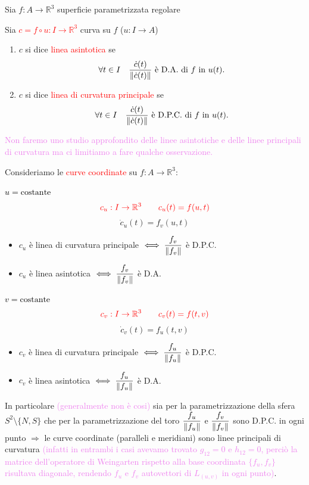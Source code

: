         \newpage
        \begin{definizione}
        Sia $f : A \to \mathbb{R}^3$ superficie parametrizzata regolare
        
        Sia \textcolor{red}{$c = f \circ u : I \to \mathbb{R}^3$} curva su $f$ \textcolor{blu}{($u : I \to A$)}
        \begin{enumerate}[label=\textcolor{red}{\arabic*.}]
            \item $c$ si dice \textcolor{red}{linea asintotica} se
            \[
            \forall t \in I \quad \dfrac{\dot{c}(t)}{\lVert\dot{c}(t)\rVert} \text{ è D.A. di } f \text{ in } u(t).
            \]
            \item $c$ si dice \textcolor{red}{linea di curvatura principale} se
            \[
            \forall t \in I \quad \dfrac{\dot{c}(t)}{\lVert\dot{c}(t)\rVert} \text{ è D.P.C. di } f \text{ in } u(t).
            \]
        \end{enumerate}
        \textcolor{violet}{Non faremo uno studio approfondito delle linee asintotiche e delle linee principali di curvatura ma ci limitiamo a fare qualche osservazione.}
        \end{definizione}

        \begin{osservazione}
        Consideriamo le \textcolor{red}{curve coordinate} su $f : A \to \mathbb{R}^3$:

        \noindent \textcolor{black}{$u = \text{costante}$}
        \[
         \color{red} c_u : I \to \mathbb{R}^3 \qquad c_u(t) = f(u,t)
        \]
        \[
        \dot{c}_u(t) = f_v(u,t)
        \]
        \begin{itemize}
            \item $c_u$ è linea di curvatura principale $\iff \dfrac{f_v}{\lVert f_v\rVert}$ è D.P.C.
            \item $c_u$ è linea asintotica $\iff \dfrac{f_v}{\lVert f_v\rVert}$ è D.A.
        \end{itemize}

        \noindent \textcolor{black}{$v = \text{costante}$}
        \[
        \color{red} c_v : I \to \mathbb{R}^3 \qquad c_v(t) = f(t,v)
        \]
        \[
        \dot{c}_v(t) = f_u(t,v)
        \]
        \begin{itemize}
            \item $c_v$ è linea di curvatura principale $\iff \dfrac{f_u}{\lVert f_u\rVert}$ è D.P.C.
            \item $c_v$ è linea asintotica $\iff \dfrac{f_u}{\lVert f_u\rVert}$ è D.A. 
        \end{itemize}
        In particolare \textcolor{violet}{(generalmente non è cosi)} sia per la parametrizzazione della sfera $S^2 \setminus \{N,S\}$ che per la parametrizzazione del toro 
        $\dfrac{f_u}{\lVert f_u\rVert}$ e $\dfrac{f_v}{\lVert f_v\rVert}$ sono D.P.C. in ogni punto $\Rightarrow$
        le curve coordinate (paralleli e meridiani) sono linee principali di curvatura 
        \textcolor{violet}{(infatti in entrambi i casi avevamo trovato $g_{12} = 0$ e $h_{12} = 0$, perciò la matrice dell'operatore di Weingarten rispetto alla base coordinata $\{f_u, f_v\}$ risultava diagonale, rendendo $f_u$ e $f_v$ autovettori di $L_{(u,v)}$ in ogni punto)}.
        \end{osservazione}

